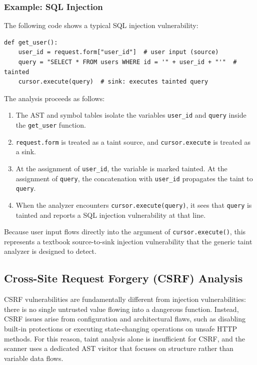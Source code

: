 \subsubsection{Example: SQL Injection}
\label{sec:static_sql_example}

The following code shows a typical SQL injection vulnerability:

\begin{lstlisting}[style=pycode]
def get_user():
    user_id = request.form["user_id"]  # user input (source)
    query = "SELECT * FROM users WHERE id = '" + user_id + "'"  # tainted
    cursor.execute(query)  # sink: executes tainted query
\end{lstlisting}

The analysis proceeds as follows:
\begin{enumerate}
  \item The AST and symbol tables isolate the variables \texttt{user\_id} and \texttt{query} inside the \texttt{get\_user} function.
  \item \texttt{request.form} is treated as a taint source, and \texttt{cursor.execute} is treated as a sink.
  \item At the assignment of \texttt{user\_id}, the variable is marked tainted. At the assignment of \texttt{query}, the concatenation with \texttt{user\_id} propagates the taint to \texttt{query}.
  \item When the analyzer encounters \texttt{cursor.execute(query)}, it sees that \texttt{query} is tainted and reports a SQL injection vulnerability at that line.
\end{enumerate}
Because user input flows directly into the argument of \texttt{cursor.execute()}, this represents a textbook source-to-sink injection vulnerability that the generic taint analyzer is designed to detect.

\subsection{Cross-Site Request Forgery (CSRF) Analysis}
\label{sec:static_csrf}

CSRF vulnerabilities are fundamentally different from injection vulnerabilities: there is no single untrusted value flowing into a dangerous function. Instead, CSRF issues arise from configuration and architectural flaws, such as disabling built-in protections or executing state-changing operations on unsafe HTTP methods. For this reason, taint analysis alone is insufficient for CSRF, and the scanner uses a dedicated AST visitor that focuses on structure rather than variable data flows.

